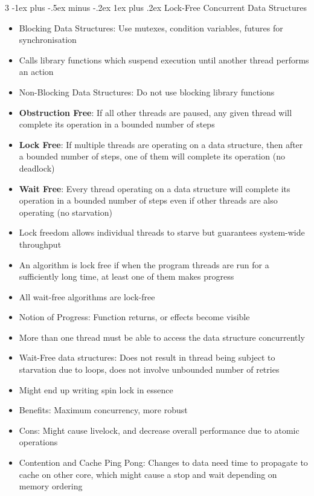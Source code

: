 \documentclass[10pt, landscape]{article}
\makeatletter
\renewcommand{\subsection}{\@startsection{subsection}{3}{0mm}%
                                {-1ex plus -.5ex minus -.2ex}%
                                {1ex plus .2ex}%
                                {\normalfont\small\bfseries}}%
\makeatother
\begin{document}
\begin{multicols*}{3}
\subsection{Lock-Free Concurrent Data Structures}
\begin{itemize}
    \item Blocking Data Structures: Use mutexes, condition variables, futures for synchronisation
    \item Calls library functions which suspend execution until another thread performs an action
    \item Non-Blocking Data Structures: Do not use blocking library functions
    \item \textbf{Obstruction Free}: If all other threads are paused, any given thread will complete its operation in a bounded number of steps
    \item \textbf{Lock Free}: If multiple threads are operating on a data structure, then after a bounded number of steps, one of them will complete its operation (no deadlock)
    \item \textbf{Wait Free}: Every thread operating on a data structure will complete its operation in a bounded number of steps even if other threads are also operating (no starvation)
    \item Lock freedom allows individual threads to starve but guarantees system-wide throughput
    \item An algorithm is lock free if when the program threads are run for a sufficiently long time, at least one of them makes progress
    \item All wait-free algorithms are lock-free
    \item Notion of Progress: Function returns, or effects become visible
    \item More than one thread must be able to access the data structure concurrently
    \item Wait-Free data structures: Does not result in thread being subject to starvation due to loops, does not involve unbounded number of retries
    \item Might end up writing spin lock in essence
    \item Benefits: Maximum concurrency, more robust
    \item Cons: Might cause livelock, and decrease overall performance due to atomic operations
    \item Contention and Cache Ping Pong: Changes to data need time to propagate to cache on other core, which might cause a stop and wait depending on memory ordering

\end{itemize}
\end{multicols*}
\end{document}
